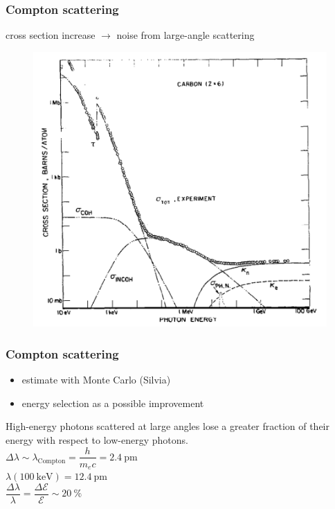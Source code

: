 \documentclass[first,firstsupp]{ETHclass}
\newcommand{\energy}{\mathcal{E}}
\begin{document}
    \begin{frame}
        \frametitle{Compton scattering}
        cross section increase $\longrightarrow$ noise from large-angle scattering 
        \begin{figure}[h]
            \centering
            \includegraphics[width=.6\textwidth]{carbon_cross_sections}
        \end{figure}
    \end{frame}

    \begin{frame}
        \frametitle{Compton scattering}
        \begin{itemize}
            \item estimate with Monte Carlo (Silvia\textcopyright)
            \item energy selection as a possible improvement
        \end{itemize}
        \begin{block}
            {}
            High-energy photons scattered at large angles lose a greater
            fraction of their energy with respect to low-energy photons.
            \vspace{.5\baselineskip}\\
            $\Delta \lambda \sim \lambda_{\text{Compton}} = \dfrac{h}{m_e c} =
            \SI{2.4}{\pico\metre}$
            \vspace{.5\baselineskip}\\
            $\lambda(\SI{100}{\kilo\electronvolt}) = \SI{12.4}{\pico\metre}$
            \vspace{.5\baselineskip}\\
            $\dfrac{\Delta \lambda}{\lambda} = \dfrac{\Delta \energy}{\energy} \sim
            \SI{20}{\percent}$
        \end{block}
    \end{frame}
\end{document}

